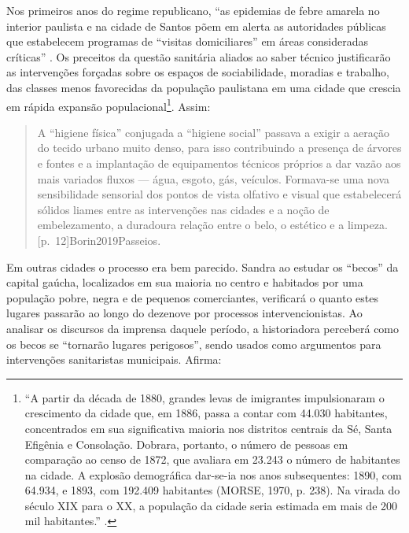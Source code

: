 \begin{refsection}
    Nos primeiros anos do regime republicano, ``as epidemias de febre amarela no interior paulista e na cidade de Santos põem em alerta as autoridades públicas que estabelecem programas de ``visitas domiciliares'' em áreas consideradas críticas'' \cite[p.~19]{Bresciani2010Sanitarismo}.  Os preceitos da questão sanitária aliados ao saber técnico justificarão as intervenções forçadas sobre os espaços de sociabilidade, moradias e trabalho, das classes menos favorecidas da população paulistana em uma cidade que crescia em rápida expansão populacional\footnote{``A partir da década de 1880, grandes levas de imigrantes impulsionaram o crescimento da cidade que, em 1886, passa a contar com 44.030 habitantes, concentrados em sua significativa maioria nos distritos centrais da Sé, Santa Efigênia e Consolação. Dobrara, portanto, o número de pessoas em comparação ao censo de 1872, que avaliara em 23.243 o número de habitantes na cidade. A explosão demográfica dar-se-ia nos anos subsequentes: 1890, com 64.934, e 1893, com 192.409 habitantes (MORSE, 1970, p. 238). Na virada do século XIX para o XX, a população da cidade seria estimada em mais de 200 mil habitantes.'' \cite[p.~20]{Bresciani2010Sanitarismo}.}. Assim:

    \begin{quotation}
        A ``higiene física'' conjugada a ``higiene social'' passava a exigir a aeração do tecido urbano muito denso, para isso contribuindo a presença de árvores e fontes e a implantação de equipamentos técnicos próprios a dar vazão aos mais variados fluxos --- água, esgoto, gás, veículos. Formava-se uma nova sensibilidade sensorial dos pontos de vista olfativo e visual que estabelecerá sólidos liames entre as intervenções nas cidades e a noção de embelezamento, a duradoura relação entre o belo, o estético e a limpeza. [p.~12]{Borin2019Passeios}.
    \end{quotation}

    Em outras cidades o processo era bem parecido. Sandra \textcite{Pesavento2001EraUmaVez} ao estudar os ``becos'' da capital gaúcha, localizados em sua maioria no centro e habitados por uma população pobre, negra e de pequenos comerciantes, verificará o quanto estes lugares passarão ao longo do dezenove por processos intervencionistas. Ao analisar os discursos da imprensa daquele período, a historiadora perceberá como os becos se ``tornarão lugares perigosos'', sendo usados como argumentos para intervenções sanitaristas municipais.  Afirma: 


\end{refsection}
